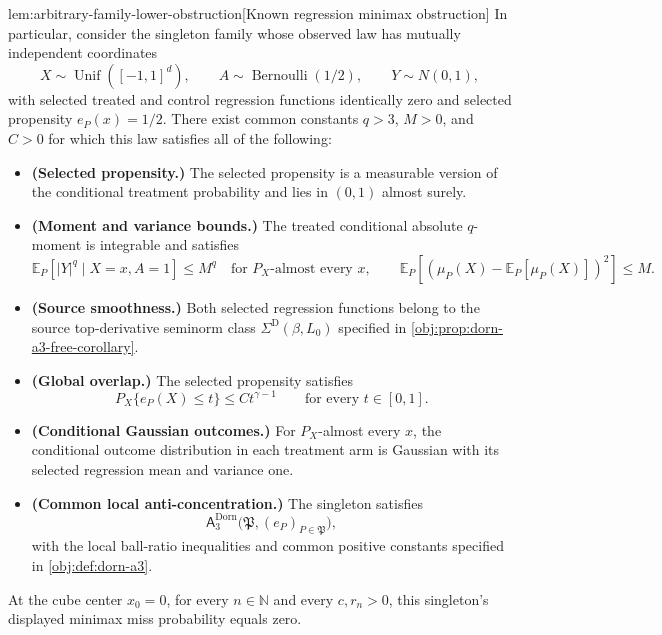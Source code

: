 \documentclass[11pt]{article}
\begin{document}
\begin{lemmav}{lem:arbitrary-family-lower-obstruction}[Known regression minimax obstruction]
In particular, consider the singleton family whose observed law has mutually independent coordinates
\[
X\sim\operatorname{Unif}([-1,1]^d),
\qquad
A\sim\operatorname{Bernoulli}(1/2),
\qquad
Y\sim N(0,1),
\]
with selected treated and control regression functions identically zero and selected propensity \(e_P(x)=1/2\). There exist common constants \(q>3\), \(M>0\), and \(C>0\) for which this law satisfies all of the following:
\begin{itemize}
\item \textbf{(Selected propensity.)} The selected propensity is a measurable version of the conditional treatment probability and lies in \((0,1)\) almost surely.
\item \textbf{(Moment and variance bounds.)} The treated conditional absolute \(q\)-moment is integrable and satisfies
\[
\mathbb E_P\!\left[|Y|^q\mid X=x,A=1\right]\le M^q
\quad\text{for }P_X\text{-almost every }x,
\qquad
\mathbb E_P\!\left[
\left(\mu_P(X)-\mathbb E_P[\mu_P(X)]\right)^2
\right]\le M.
\]
\item \textbf{(Source smoothness.)} Both selected regression functions belong to the source top-derivative seminorm class \(\Sigma^{\mathrm D}(\beta,L_0)\) specified in \cref{obj:prop:dorn-a3-free-corollary}.
\item \textbf{(Global overlap.)} The selected propensity satisfies
\[
P_X\{e_P(X)\le t\}\le C t^{\gamma-1}
\qquad\text{for every }t\in[0,1].
\]
\item \textbf{(Conditional Gaussian outcomes.)} For \(P_X\)-almost every \(x\), the conditional outcome distribution in each treatment arm is Gaussian with its selected regression mean and variance one.
\item \textbf{(Common local anti-concentration.)} The singleton satisfies
\[
\mathsf A_{3}^{\mathrm{Dorn}}
\bigl(\mathfrak P,(e_P)_{P\in\mathfrak P}\bigr),
\]
with the local ball-ratio inequalities and common positive constants specified in \cref{obj:def:dorn-a3}.
\end{itemize}
At the cube center \(x_0=0\), for every \(n\in\mathbb N\) and every \(c,r_n>0\), this singleton's displayed minimax miss probability equals zero.
\end{lemmav}
\end{document}
